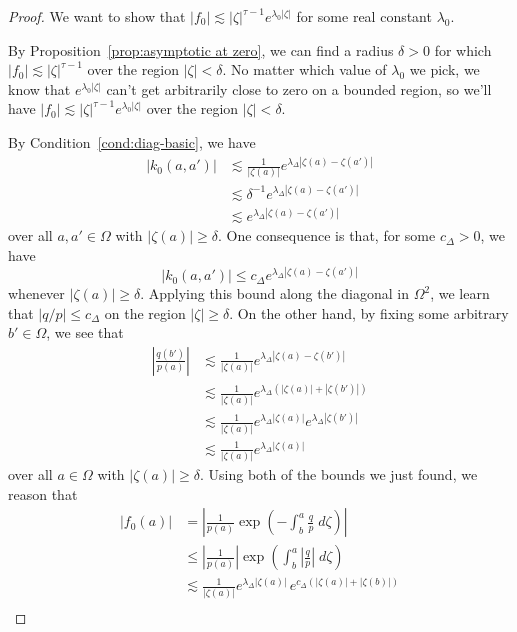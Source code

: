\documentclass{article}
\theoremstyle{plain}
\newcommand{\hardker}{k_0}
\newcommand{\solproto}{f_0}
\newcommand{\domain}{\Omega}
\begin{document}
\begin{proof}
We want to show that $|\solproto| \lesssim |\zeta|^{\tau-1} e^{\lambda_0|\zeta|}$ for some real constant $\lambda_0$.

By Proposition~\ref{prop:asymptotic at zero}, we can find a radius $\delta > 0$ for which $|\solproto| \lesssim |\zeta|^{\tau-1}$ over the region $|\zeta| < \delta$. No matter which value of $\lambda_0$ we pick, we know that $e^{\lambda_0|\zeta|}$ can't get arbitrarily close to zero on a bounded region, so we'll have $|\solproto| \lesssim |\zeta|^{\tau-1} e^{\lambda_0|\zeta|}$ over the region $|\zeta| < \delta$.

By Condition~\eqref{cond:diag-basic}, we have
\begin{align*}
|\hardker(a, a')| & \lesssim \frac{1}{|\zeta(a)|} e^{\lambda_\Delta |\zeta(a) - \zeta(a')|} \\
& \lesssim \delta^{-1} e^{\lambda_\Delta |\zeta(a) - \zeta(a')|} \\
& \lesssim e^{\lambda_\Delta |\zeta(a) - \zeta(a')|}
\end{align*}
over all $a, a' \in \domain$ with $|\zeta(a)| \ge \delta$. One consequence is that, for some $c_\Delta > 0$, we have
\[ |\hardker(a, a')| \le c_\Delta e^{\lambda_\Delta |\zeta(a) - \zeta(a')|} \]
whenever $|\zeta(a)| \ge \delta$. Applying this bound along the diagonal in $\domain^2$, we learn that $|q/p| \le c_\Delta$ on the region $|\zeta| \ge \delta$. On the other hand, by fixing some arbitrary  $b' \in \domain$, we see that
\begin{align*}
\left|\frac{q(b')}{p(a)}\right| & \lesssim \frac{1}{|\zeta(a)|} e^{\lambda_\Delta|\zeta(a) - \zeta(b')|} \\
& \lesssim \frac{1}{|\zeta(a)|} e^{\lambda_\Delta(|\zeta(a)| + |\zeta(b')|)} \\
& \lesssim \frac{1}{|\zeta(a)|} e^{\lambda_\Delta|\zeta(a)|} e^{\lambda_\Delta|\zeta(b')|} \\
& \lesssim \frac{1}{|\zeta(a)|} e^{\lambda_\Delta|\zeta(a)|}
\end{align*}
over all $a \in \domain$ with $|\zeta(a)| \ge \delta$. Using both of the bounds we just found, we reason that
\begin{align*}
|\solproto(a)| & = \left| \frac{1}{p(a)} \exp\left(-\int_{b}^{a}\frac{q}{p}\;d\zeta\right) \right| \\
& \le \left|\frac{1}{p(a)}\right| \exp\left(\int_{b}^{a}\left|\frac{q}{p}\right|\;d\zeta\right) \\
& \lesssim \frac{1}{|\zeta(a)|} e^{\lambda_\Delta|\zeta(a)|}\,e^{c_\Delta(|\zeta(a)| + |\zeta(b)|)} \\

\end{align*}
\end{proof}
\end{document}
